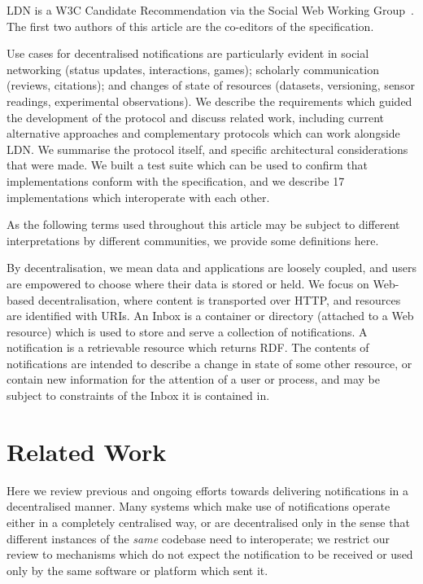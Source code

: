 \documentclass[a4paper]{llncs}
\begin{document}
\par LDN is a W3C \empty Candidate Recommendation via the \empty Social Web Working Group~\cite{ref-4}. The first two authors of this article are the co-editors of the specification.


\par Use cases for decentralised notifications are particularly evident in social networking (status updates, interactions, games); scholarly communication (reviews, citations); and changes of state of resources (datasets, versioning, sensor readings, experimental observations). We describe the requirements which guided the development of the protocol and discuss related work, including current alternative approaches and complementary protocols which can work alongside LDN. We summarise the protocol itself, and specific architectural considerations that were made. We built a test suite which can be used to confirm that implementations conform with the specification, and we describe 17 implementations which interoperate with each other.



\par As the following terms used throughout this article may be subject to different interpretations by different communities, we provide some definitions here.


\par By decentralisation, we mean data and applications are loosely coupled, and users are empowered to choose where their data is stored or held. We focus on Web-based decentralisation, where content is transported over HTTP, and resources are identified with URIs. An Inbox is a container or directory (attached to a Web resource) which is used to store and serve a collection of notifications. A notification is a retrievable resource which returns RDF. The contents of notifications are intended to describe a change in state of some other resource, or contain new information for the attention of a user or process, and may be subject to constraints of the Inbox it is contained in.








                        \section{Related Work}
  \label{related-work}



\par Here we review previous and ongoing efforts towards delivering notifications in a decentralised manner. Many systems which make use of notifications operate either in a completely centralised way, or are decentralised only in the sense that different instances of the {\em same} codebase need to interoperate; we restrict our review to mechanisms which do not expect the notification to be received or used only by the same software or platform which sent it.
\end{document}
